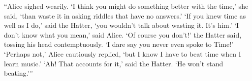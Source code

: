 ``Alice sighed wearily. ‘I think you might do something better with the time,’
she said, ‘than waste it in asking riddles that have no answers.’
‘If you knew time as well as I do,’ said the Hatter, ‘you wouldn’t talk about
wasting it. It’s him.’
‘I don’t know what you mean,’ said Alice.
‘Of course you don’t!’ the Hatter said, tossing his head contemptuously. ‘I
dare say you never even spoke to Time!’
‘Perhaps not,’ Alice cautiously replied, ‘but I know I have to beat time
when I learn music.’
‘Ah! That accounts for it,’ said the Hatter. ‘He won’t stand beating.’''
\\
\newpage

